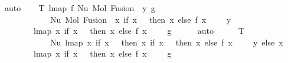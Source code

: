 \begin{isabellebody}
\ auto\isanewline
\isanewline
\ \ \isamarkupfalse%
\ T{}{\isacharcolon}{\kern0pt}\ {\isachardoublequoteopen}lmap\ f\ {\isacharparenleft}{\kern0pt}Nu\ {\isacharparenleft}{\kern0pt}Mol\ {\isacharparenleft}{\kern0pt}Fusion\ {}\ y{\isacharparenright}{\kern0pt}\ g{\isacharparenright}{\kern0pt}{\isacharparenright}{\kern0pt}\ {\isacharequal}{\kern0pt}\isanewline
\ \ \ \ \ \ \ \ \ \ \ \ Nu\ {\isacharparenleft}{\kern0pt}Mol\ {\isacharparenleft}{\kern0pt}Fusion\ {}\ {\isacharparenleft}{\kern0pt}{\isacharparenleft}{\kern0pt}{\isasymlambda}x{\isachardot}{\kern0pt}\ if\ x\ {\isacharequal}{\kern0pt}\ {}\ then\ x\ else\ f\ {\isacharparenleft}{\kern0pt}x\ {\isacharminus}{\kern0pt}\ {}{\isacharparenright}{\kern0pt}\ {\isacharplus}{\kern0pt}\ {}{\isacharparenright}{\kern0pt}\ y{\isacharparenright}{\kern0pt}{\isacharparenright}{\kern0pt}\isanewline
\ \ \ \ \ \ \ \ {\isacharparenleft}{\kern0pt}lmap\ {\isacharparenleft}{\kern0pt}{\isasymlambda}x{\isachardot}{\kern0pt}\ if\ x\ {\isacharequal}{\kern0pt}\ {}\ then\ x\ else\ f\ {\isacharparenleft}{\kern0pt}x\ {\isacharminus}{\kern0pt}\ {}{\isacharparenright}{\kern0pt}\ {\isacharplus}{\kern0pt}\ {}{\isacharparenright}{\kern0pt}\ g{\isacharparenright}{\kern0pt}{\isacharparenright}{\kern0pt}{\isachardoublequoteclose}\isanewline
\ \ \ \ \isamarkupfalse%
\ auto\isanewline
\ \ \isamarkupfalse%
\ \isamarkupfalse%
\ T{}{\isacharcolon}{\kern0pt}\ {\isachardoublequoteopen}{\isachardot}{\kern0pt}{\isachardot}{\kern0pt}{\isachardot}{\kern0pt}\ {\isasymsimeq}\isanewline
\ \ \ \ \ \ \ \ \ \ \ \ Nu\ {\isacharparenleft}{\kern0pt}lmap\ {\isacharparenleft}{\kern0pt}{\isasymlambda}x{\isachardot}{\kern0pt}\ if\ x\ {\isacharequal}{\kern0pt}\ {}\ then\ {\isacharparenleft}{\kern0pt}{\isasymlambda}x{\isachardot}{\kern0pt}\ if\ x\ {\isacharequal}{\kern0pt}\ {}\ then\ x\ else\ f\ {\isacharparenleft}{\kern0pt}x\ {\isacharminus}{\kern0pt}\ {}{\isacharparenright}{\kern0pt}\ {\isacharplus}{\kern0pt}\ {}{\isacharparenright}{\kern0pt}\ y\ else\ x{\isacharparenright}{\kern0pt}\isanewline
\ \ \ \ \ \ \ \ {\isacharparenleft}{\kern0pt}lmap\ {\isacharparenleft}{\kern0pt}{\isasymlambda}x{\isachardot}{\kern0pt}\ if\ x\ {\isacharequal}{\kern0pt}\ {}\ then\ x\ else\ f\ {\isacharparenleft}{\kern0pt}x\ {\isacharminus}{\kern0pt}\ {}{\isacharparenright}{\kern0pt}\ {\isacharplus}{\kern0pt}\ {}{\isacharparenright}{\kern0pt}\ g{\isacharparenright}{\kern0pt}{\isacharparenright}{\kern0pt}{\isachardoublequoteclose}\isanewline

\end{isabellebody}
